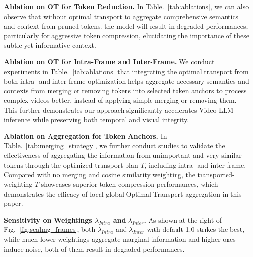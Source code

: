 \noindent \textbf{Ablation on OT for Token Reduction.} In Table.~\ref{tab:ablations}, we can also observe that without optimal transport to aggregate comprehensive semantics and context from pruned tokens, the model will result in degraded performances, particularly for aggressive token compression, elucidating the importance of these subtle yet informative context.



\noindent \textbf{Ablation on OT for Intra-Frame and Inter-Frame.}
We conduct experiments in Table.~\ref{tab:ablations} that integrating the optimal transport from both intra- and inter-frame optimization helps aggregate necessary semantics and contexts from merging or removing tokens into selected token anchors to process complex videos better, instead of applying simple merging or removing them. This further demonstrates our approach significantly accelerates Video LLM inference while preserving both temporal and visual integrity.



\noindent \textbf{Ablation on Aggregation for Token Anchors.}
In Table.~\ref{tab:merging_strategy}, we further conduct studies to validate the effectiveness of aggregating the information from unimportant and very similar tokens through the optimized transport plan $T$, including intra- and inter-frame. Compared with no merging and cosine similarity weighting, the transported-weighting $T$ showcases superior token compression performances, which demonstrates the efficacy of local-global Optimal Transport aggregation in this paper.


\noindent \textbf{Sensitivity on Weightings $\lambda_{Intra}$ and $\lambda_{Inter}$.} As shown at the right of Fig.~\ref{fig:scaling_frames}, both $\lambda_{Intra}$ and $\lambda_{Inter}$ with default 1.0 strikes the best, while much lower weightings aggregate marginal information and higher ones induce noise, both of them result in degraded performances.


\begin{table}[tb]
    \centering
    \caption{Computational overhead in terms of Intra- and Inter-Frame using Sinkhorn-Knopp Iteration (milliseconds).}
    \vspace{-0.2cm}
    \setlength\tabcolsep{2pt} %
    \vspace{-0.2cm}
    \label{tab:ota_time}
\end{table}


